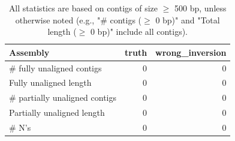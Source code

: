 \documentclass[12pt,a4paper]{article}
\begin{document}
\begin{table}[ht]
\begin{center}
\caption{All statistics are based on contigs of size $\geq$ 500 bp, unless otherwise noted (e.g., "\# contigs ($\geq$ 0 bp)" and "Total length ($\geq$ 0 bp)" include all contigs).}
\begin{tabular}{|l*{2}{|r}|}
\hline
Assembly & truth & wrong\_inversion \\ \hline
\# fully unaligned contigs & 0 & 0 \\ \hline
Fully unaligned length & 0 & 0 \\ \hline
\# partially unaligned contigs & 0 & 0 \\ \hline
Partially unaligned length & 0 & 0 \\ \hline
\# N's & 0 & 0 \\ \hline
\end{tabular}
\end{center}
\end{table}
\end{document}

